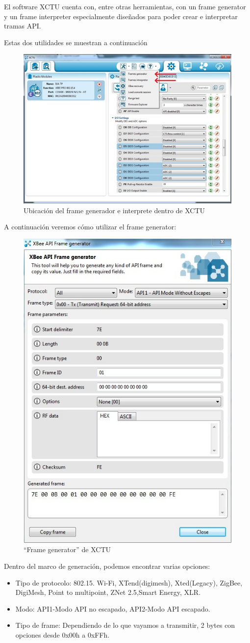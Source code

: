 \documentclass[11pt,oneside,spanish,a4paper]{article}
\begin{document}
El software XCTU cuenta con, entre otras herramientas, con un frame generator y un frame interpreter especialmente diseñados para poder crear e interpretar tramas API.

Estas dos utilidades se muestran a continuación

\begin{figure}[ht]
	\centering
	\includegraphics[width=.6\textwidth]{img/IMAGEN08.jpg}
	\caption{Ubicaci\'on del frame generador e interprete dentro de XCTU}
\end{figure}
A continuación veremos cómo utilizar el frame generator:
\begin{figure}[ht]
	\centering
	\includegraphics[width=.6\textwidth]{img/IMAGEN09.jpg}
	\caption{``Frame generator'' de XCTU}
\end{figure}
Dentro del marco de generaci\'on, podemos encontrar varias opciones:
\begin{itemize}
	\item Tipo de protocolo: 802.15. Wi-Fi, XTend(digimesh), Xted(Legacy), ZigBee, DigiMesh, Point to multipoint, ZNet 2.5,Smart Energy, XLR.
	\item Modo: API1-Modo API no escapado, API2-Modo API escapado.
	\item Tipo de frame: Dependiendo de lo que vayamos a transmitir, 2 bytes con opciones desde 0x00h a 0xFFh.
	\end{itemize}
\end{document}
